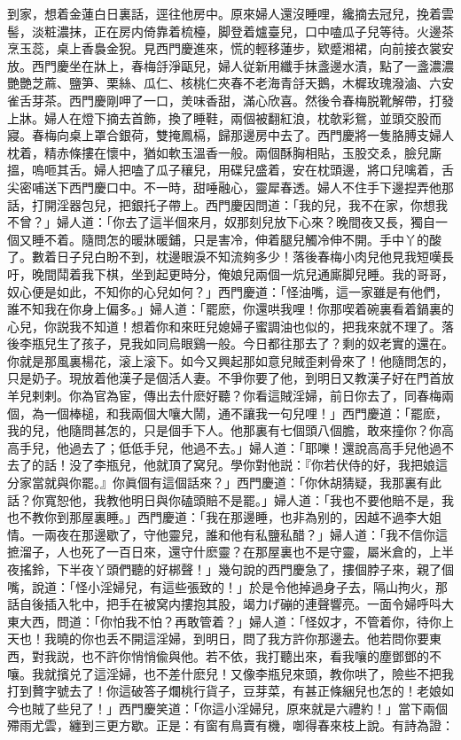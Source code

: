到家，想着金蓮白日裏話，逕往他房中。原來婦人還沒睡哩，纔摘去冠兒，挽着雲髻，淡粧濃抹，正在房内倚靠着梳檯，脚登着爐臺兒，口中嗑瓜子兒等待。火邊茶烹玉蕊，桌上香裊金猊。見西門慶進來，慌的輕移蓮步，欵蹙湘裙，向前接衣裳安放。西門慶坐在牀上，春梅㧱淨甌兒，婦人従新用纖手抹盞邊水漬，點了一盞濃濃艷艷芝蔴、鹽笋、栗絲、瓜仁、核桃仁夾春不老海青㧱天鵝，木樨玫瑰潑滷、六安雀舌芽茶。西門慶剛呷了一口，羙味香甜，滿心欣喜。然後令春梅脱靴解帶，打發上牀。婦人在燈下摘去首飾，換了睡鞋，兩個被翻紅浪，枕欹彩鴛，並頭交股而寢。春梅向桌上罩合銀荷，雙掩鳳槅，歸那邊房中去了。西門慶將一隻胳膊支婦人枕着，精赤條摟在懷中，猶如軟玉溫香一般。兩個酥胸相貼，玉股交ゑ，臉兒廝搵，嗚咂其舌。婦人把嗑了瓜子穰兒，用碟兒盛着，安在枕頭邊，將口兒噙着，舌尖密哺送下西門慶口中。不一時，甜唾融心，靈犀春透。婦人不住手下邊揑弄他那話，打開淫器包兒，把銀托子帶上。西門慶因問道：「我的兒，我不在家，你想我不曾？」婦人道：「你去了這半個來月，奴那刻兒放下心來？晚間夜又長，獨自一個又睡不着。隨問怎的暖牀暖鋪，只是害冷，伸着腿兒觸冷伸不開。手中丫的酸了。數着日子兒白盼不到，枕邊眼淚不知流夠多少！落後春梅小肉兒他見我短嘆長吁，晚間鬦着我下棋，坐到起更時分，俺娘兒兩個一炕兒通廝脚兒睡。我的哥哥，奴心便是如此，不知你的心兒如何？」西門慶道：「怪油嘴，這一家雖是有他們，誰不知我在你身上偏多。」婦人道：「罷麽，你還哄我哩！你那喫着碗裏看着鍋裏的心兒，你説我不知道！想着你和來旺兒媳婦子蜜調油也似的，把我來就不理了。落後李瓶兒生了孩子，見我如同烏眼鷄一般。今日都往那去了？剩的奴老實的還在。你就是那風裏楊花，滚上滚下。如今又興起那如意兒賊歪剌骨來了！他隨問怎的，只是奶子。現放着他漢子是個活人妻。不爭你要了他，到明日又教漢子好在門首放羊兒剌剌。你為官為宦，傳出去什麽好聽？你看這賊淫婦，前日你去了，同春梅兩個，為一個棒槌，和我兩個大嚷大鬧，通不讓我一句兒哩！」西門慶道：「罷麽，我的兒，他隨問甚怎的，只是個手下人。他那裏有七個頭八個膽，敢來撞你？你高高手兒，他過去了；低低手兒，他過不去。」婦人道：「耶嚛！還說高高手兒他過不去了的話！没了李瓶兒，他就頂了窝兒。學你對他説：『你若伏侍的好，我把娘這分家當就與你罷。』你眞個有這個話來？」西門慶道：「你休胡猜疑，我那裏有此話？你寬恕他，我教他明日與你磕頭賠不是罷。」婦人道：「我也不要他賠不是，我也不教你到那屋裏睡。」西門慶道：「我在那邊睡，也非為别的，因越不過李大姐情。一兩夜在那邊歇了，守他靈兒，誰和他有私鹽私醋？」婦人道：「我不信你這摭溜子，人也死了一百日來，還守什麽靈？在那屋裏也不是守靈，屬米倉的，上半夜搖鈴，下半夜丫頭們聽的好梆聲！」幾句說的西門慶急了，摟個脖子來，親了個嘴，說道：「怪小淫婦兒，有這些張致的！」於是令他掉過身子去，隔山拘火，那話自後插入牝中，把手在被窝内摟抱其股，竭力げ磞的連聲響亮。一面令婦呼呌大東大西，問道：「你怕我不怕？再敢管着？」婦人道：「怪奴才，不管着你，待你上天也！我曉的你也丢不開這淫婦，到明日，問了我方許你那邊去。他若問你要東西，對我説，也不許你悄悄偸與他。若不依，我打聽出來，看我嚷的塵鄧鄧的不嚷。我就擯兑了這淫婦，也不差什麽兒！又像李瓶兒來頭，教你哄了，險些不把我打到贅字號去了！你這破答子爛桃行貨子，豆芽菜，有甚正條綑兒也怎的！老娘如今也賊了些兒了！」西門慶笑道：「你這小淫婦兒，原來就是六禮約！」當下兩個殢雨尤雲，纏到三更方歇。正是：有窗有鳥賣有機，啣得春來枝上說。有詩為證：

